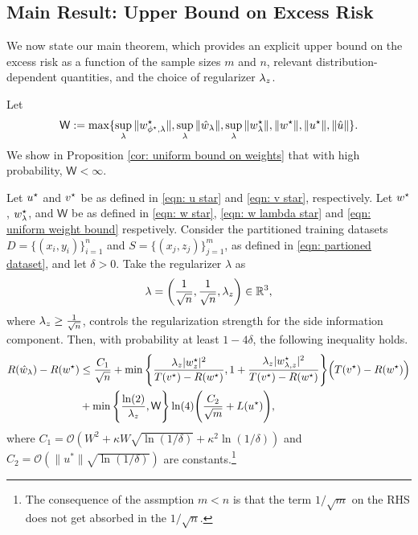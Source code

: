 \subsection{Main Result: Upper Bound on Excess Risk}

We now state our main theorem, which provides an explicit upper bound on the excess risk as a function of the sample sizes $m$ and $n$, relevant distribution-dependent quantities, and the choice of regularizer $\lambda_z$.

Let
\begin{equation}\label{eqn: uniform weight bound}
    \mathsf{W} := \max\{\sup_\lambda\|w^\star_{\phi^{\star},\lambda}\|,\sup_\lambda\|\hat{w}_\lambda\|,\sup_\lambda\|w^\star_{\lambda}\|,\|w^\star\|,\|u^\star\|,\|\hat{u}\|\}.
\end{equation}
We show in Proposition \ref{cor: uniform bound on weights} that with high probability, $\mathsf{W} < \infty$.


\begin{thm}\label{thm: main theorem}
    Let $u^\star$ and $v^\star$ be as defined in \eqref{eqn: u star} and \eqref{eqn: v star}, respectively. Let $w^\star$, $w^\star_{\lambda}$, and $\mathsf{W}$ be as defined in \eqref{eqn: w star}, \eqref{eqn: w lambda star} and \eqref{eqn: uniform weight bound} respetively.
Consider the partitioned training datasets $D = \{(x_i, y_i)\}_{i=1}^n$ and $S = \{(x_j, z_j)\}_{j=1}^{m}$, as defined in \eqref{eqn: partioned dataset}, and let $\delta > 0$. Take the regularizer $\lambda$ as
\begin{equation*}
    \lambda = \left(\frac{1}{\sqrt{n}}, \frac{1}{\sqrt{n}}, \lambda_z\right) \in \mathbb{R}^{3},
\end{equation*}
where $\lambda_z \geq \frac{1}{\sqrt{n}}$, controls the regularization strength for the side information component.
Then, with probability at least $1-4\delta$, the following inequality holds.
   \begin{equation}\label{eqn: main equation}
        \begin{aligned}
            R(\hat{w}_\lambda) - R(w^\star) &\leq \frac{C_1}{\sqrt{n}} +
            \min\Bigg\{\frac{\lambda_z|w^\star_z|^2}{T(v^\star) - R(w^\star)},
            1+\frac{\lambda_z |w^\star_{{\lambda,z}}|^2}{T(v^\star) - R(w^\star)}\Bigg\}\Big(T(v^\star) - R(w^\star)\Big) \\
            &+
            \min\Bigg\{\frac{\ln(2)}{\lambda_z},\mathsf{W}\Bigg\}\ln(4)\Bigg(\frac{C_2}{\sqrt{m}} + L(u^\star)\Bigg),
        \end{aligned}  
    \end{equation}
  where $C_1 = \mathcal{O}\left( W^2 + \kappa W \sqrt{\ln(1/\delta)} + \kappa^2 \ln(1/\delta) \right)$ and $C_2 = \mathcal{O}\left( \|u^*\| \sqrt{\ln(1/\delta)} \right)$ are constants.\footnote{The consequence of the assmption $m < n$ is that the term $1/\sqrt{m}$ on the RHS does not get absorbed in the $1/\sqrt{n}$.}
\end{thm}


